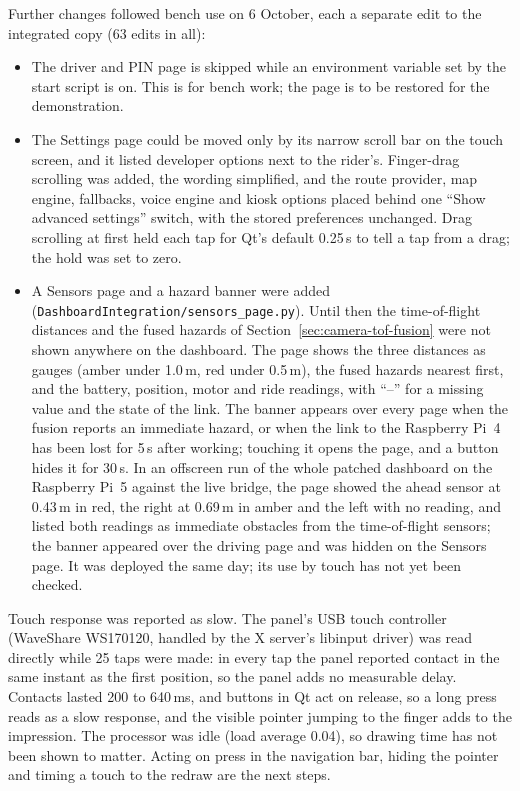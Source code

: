 Further changes followed bench use on 6 October, each a separate edit to the integrated copy (63 edits in all):
\begin{itemize}
\item The driver and PIN page is skipped while an environment variable set by the start script is on. This is for bench work; the page is to be restored for the demonstration.
\item The Settings page could be moved only by its narrow scroll bar on the touch screen, and it listed developer options next to the rider's. Finger-drag scrolling was added, the wording simplified, and the route provider, map engine, fallbacks, voice engine and kiosk options placed behind one ``Show advanced settings'' switch, with the stored preferences unchanged. Drag scrolling at first held each tap for Qt's default 0.25\,s to tell a tap from a drag; the hold was set to zero.
\item A Sensors page and a hazard banner were added (\texttt{DashboardIntegration/sensors\_page.py}). Until then the time-of-flight distances and the fused hazards of Section~\ref{sec:camera-tof-fusion} were not shown anywhere on the dashboard. The page shows the three distances as gauges (amber under 1.0\,m, red under 0.5\,m), the fused hazards nearest first, and the battery, position, motor and ride readings, with ``--'' for a missing value and the state of the link. The banner appears over every page when the fusion reports an immediate hazard, or when the link to the Raspberry Pi~4 has been lost for 5\,s after working; touching it opens the page, and a button hides it for 30\,s. In an offscreen run of the whole patched dashboard on the Raspberry Pi~5 against the live bridge, the page showed the ahead sensor at 0.43\,m in red, the right at 0.69\,m in amber and the left with no reading, and listed both readings as immediate obstacles from the time-of-flight sensors; the banner appeared over the driving page and was hidden on the Sensors page. It was deployed the same day; its use by touch has not yet been checked.
\end{itemize}

Touch response was reported as slow. The panel's USB touch controller (WaveShare WS170120, handled by the X server's libinput driver) was read directly while 25 taps were made: in every tap the panel reported contact in the same instant as the first position, so the panel adds no measurable delay. Contacts lasted 200 to 640\,ms, and buttons in Qt act on release, so a long press reads as a slow response, and the visible pointer jumping to the finger adds to the impression. The processor was idle (load average 0.04), so drawing time has not been shown to matter. Acting on press in the navigation bar, hiding the pointer and timing a touch to the redraw are the next steps.

